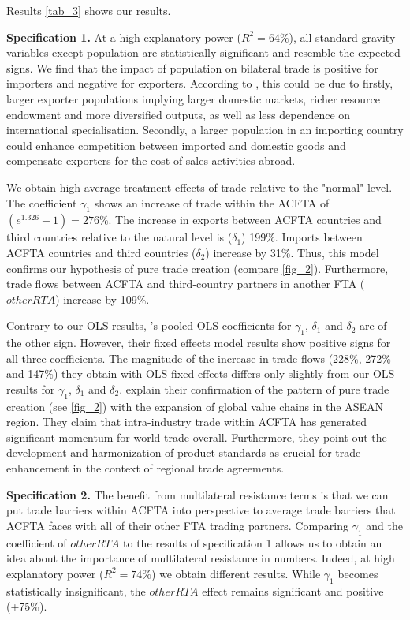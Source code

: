 \begin{section}{Results}
\autoref{tab_3} shows our results.

\textbf{Specification 1.}
At a high explanatory power ($R^2 = 64\%$), all standard gravity variables except population are statistically significant and resemble the expected signs. We find that the impact of population on bilateral trade is positive for importers and negative for exporters. According to \cite{wla_2021}, this could be due to firstly, larger exporter populations implying larger domestic markets, richer resource endowment and more diversified outputs, as well as less dependence on international specialisation. Secondly, a larger population in an importing country could enhance competition between imported and domestic goods and compensate exporters for the cost of sales activities abroad.

We obtain high average treatment effects of trade relative to the "normal" level. The coefficient $\gamma_1$ shows an increase of trade within the ACFTA of $(e^{1.326}-1)=276\%$. The increase in exports between ACFTA countries and third countries relative to the natural level is ($\delta_1$) 199\%. Imports between ACFTA countries and third countries ($\delta_2$) increase by 31\%. Thus, this model confirms our hypothesis of pure trade creation (compare \autoref{fig_2}). Furthermore, trade flows between ACFTA and third-country partners in another FTA ($otherRTA$) increase by 109\%.

Contrary to our OLS results, \cite{wla_2021}'s pooled OLS coefficients for $\gamma_1$, $\delta_1$ and $\delta_2$ are of the other sign. However, their fixed effects model results show positive signs for all three coefficients. The magnitude of the increase in trade flows (228\%, 272\% and 147\%) they obtain with OLS fixed effects differs only slightly from our OLS results for $\gamma_1$, $\delta_1$ and $\delta_2$. \cite{wla_2021} explain their confirmation of the pattern of pure trade creation (see \autoref{fig_2}) with the expansion of global value chains in the ASEAN region. They claim that intra-industry trade within ACFTA has generated significant momentum for world trade overall. Furthermore, they point out the development and harmonization of product standards as crucial for trade-enhancement in the context of regional trade agreements.

\textbf{Specification 2.}
The benefit from multilateral resistance terms is that we can put trade barriers within ACFTA into perspective to average trade barriers that ACFTA faces with all of their other FTA trading partners. Comparing $\gamma_1$ and the coefficient of $otherRTA$ to the results of specification 1 allows us to obtain an idea about the importance of multilateral resistance in numbers. Indeed, at high explanatory power ($R^2 = 74\%$) we obtain different results. While $\gamma_1$ becomes statistically insignificant, the $otherRTA$ effect remains significant and positive (+75\%).  


\end{section}
